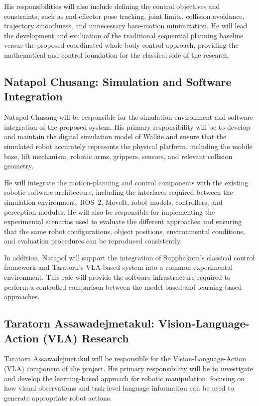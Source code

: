 \documentclass[12pt,a4paper]{article}
\begin{document}
His responsibilities will also include defining the control objectives and constraints, such
as end-effector pose tracking, joint limits, collision avoidance, trajectory smoothness, and
unnecessary base-motion minimization. He will lead the development and evaluation of the
traditional sequential planning baseline versus the proposed coordinated whole-body control
approach, providing the mathematical and control foundation for the classical side of the
research.

\subsection*{Natapol Chusang: Simulation and Software Integration}

Natapol Chusang will be responsible for the simulation environment and software
integration of the proposed system. His primary responsibility will be to develop and maintain
the digital simulation model of Walkie and ensure that the simulated robot accurately
represents the physical platform, including the mobile base, lift mechanism, robotic arms,
grippers, sensors, and relevant collision geometry.

He will integrate the motion-planning and control components with the existing robotic
software architecture, including the interfaces required between the simulation environment,
ROS~2, MoveIt, robot models, controllers, and perception modules. He will also be responsible
for implementing the experimental scenarios used to evaluate the different approaches and
ensuring that the same robot configurations, object positions, environmental conditions, and
evaluation procedures can be reproduced consistently.

In addition, Natapol will support the integration of Supphakorn's classical control
framework and Taratorn's VLA-based system into a common experimental environment. This
role will provide the software infrastructure required to perform a controlled comparison
between the model-based and learning-based approaches.

\subsection*{Taratorn Assawadejmetakul: Vision-Language-Action (VLA) Research}

Taratorn Assawadejmetakul will be responsible for the Vision-Language-Action (VLA)
component of the project. His primary responsibility will be to investigate and develop the
learning-based approach for robotic manipulation, focusing on how visual observations and
task-level language information can be used to generate appropriate robot actions.
\end{document}
